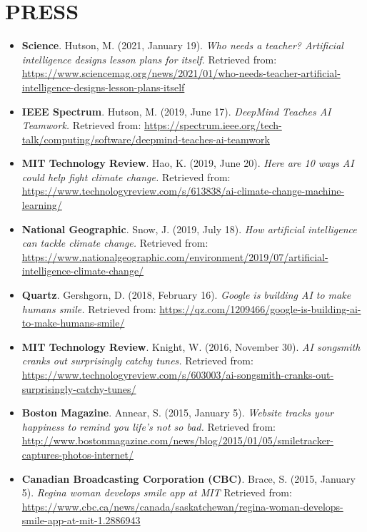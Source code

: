 \documentclass[paper=letter,fontsize=11pt]{scrartcl} %
\newcommand{\NewPart}[2]{\section*{\uppercase{#1} #2}}
\newcommand{\PressEntry}[5]{
		\noindent \textbf{#5}. #1 (#2). \textit{#3} Retrieved from: \url{#4}}
\begin{document}
\NewPart{Press}{}
\begin{itemize}
\item\PressEntry{Hutson, M.}{2021, January 19}{Who needs a teacher? Artificial intelligence designs lesson plans for itself.}{https://www.sciencemag.org/news/2021/01/who-needs-teacher-artificial-intelligence-designs-lesson-plans-itself}{Science}

\item\PressEntry{Hutson, M.}{2019, June 17}{DeepMind Teaches AI Teamwork.}{https://spectrum.ieee.org/tech-talk/computing/software/deepmind-teaches-ai-teamwork}{IEEE Spectrum}

\item\PressEntry{Hao, K.}{2019, June 20}{Here are 10 ways AI could help fight climate change.}{https://www.technologyreview.com/s/613838/ai-climate-change-machine-learning/}{MIT Technology Review}

\item\PressEntry{Snow, J.}{2019, July 18}{How artificial intelligence can tackle climate change.}{https://www.nationalgeographic.com/environment/2019/07/artificial-intelligence-climate-change/}{National Geographic}

\item\PressEntry{Gershgorn, D.}{2018, February 16}{Google is building AI to make humans smile.}{https://qz.com/1209466/google-is-building-ai-to-make-humans-smile/}{Quartz}

\item\PressEntry{Knight, W.}{2016, November 30}{AI songsmith cranks out surprisingly catchy tunes.}{https://www.technologyreview.com/s/603003/ai-songsmith-cranks-out-surprisingly-catchy-tunes/}{MIT Technology Review}

\item\PressEntry{Annear, S.}{2015, January 5}{Website tracks your happiness to remind you life’s not so bad.}{http://www.bostonmagazine.com/news/blog/2015/01/05/smiletracker-captures-photos-internet/}{Boston Magazine}

\item\PressEntry{Brace, S.}{2015, January 5}{Regina woman develops smile app at MIT}
{https://www.cbc.ca/news/canada/saskatchewan/regina-woman-develops-smile-app-at-mit-1.2886943}{Canadian Broadcasting Corporation (CBC)}

\end{itemize}


\end{document}
